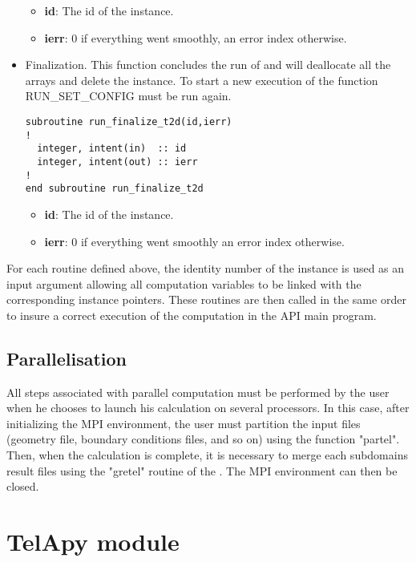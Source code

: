 \begin{itemize}
\begin{itemize}
\item \textbf{id}: The id of the instance.
\item \textbf{ierr}: 0 if everything went smoothly, an error index otherwise.
\end{itemize}

\item Finalization. This function concludes the run of  and will
  deallocate all the arrays and delete the instance. To start a new execution
  of  the function RUN\_SET\_CONFIG must be run again.


\begin{lstlisting}
subroutine run_finalize_t2d(id,ierr)
!
  integer, intent(in)  :: id
  integer, intent(out) :: ierr
!
end subroutine run_finalize_t2d
\end{lstlisting}

\begin{itemize}
\item \textbf{id}: The id of the instance.
\item \textbf{ierr}: 0 if everything went smoothly an error index otherwise.
\end{itemize}

\end{itemize}

For each routine defined above, the identity number of the instance is used as
an input argument allowing all computation variables to be linked with the
corresponding instance pointers. These routines are then called in the same
order to insure a correct execution of the computation in the API main
program.

\subsection{Parallelisation}
\label{subsec:para}
All steps associated with parallel computation must be performed by the user
when he chooses to launch his calculation on several processors. In this case,
after initializing the MPI environment, the user must partition the input files
(geometry file, boundary conditions files, and so on) using the \fortran
function "partel". Then, when the calculation is complete, it is necessary to
merge each subdomains result files using the "gretel" routine of the
\telemacsystem. The MPI environment can then be closed.

\section{TelApy module}

